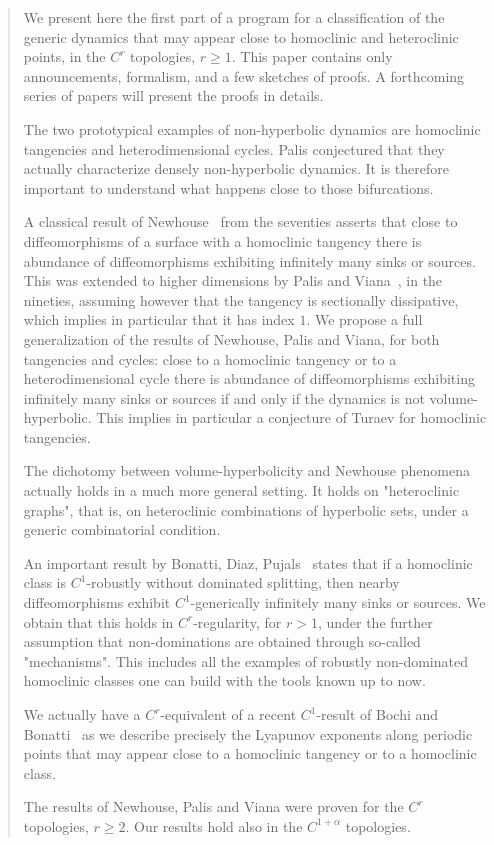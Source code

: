 \documentclass[11pt, a4paper]{amsart}
\theoremstyle{plain}
\theoremstyle{definition}
\theoremstyle{remark}
\numberwithin{equation}{section}         %
\begin{document}
\begin{abstract}
We present here the first part of a program for a classification of the generic dynamics that may appear close to homoclinic and heteroclinic points, in the $C^r$ topologies, $r\geq 1$. This paper contains only announcements, formalism, and a few sketches of proofs. A forthcoming series of papers will present the  proofs in details.


The two prototypical examples of non-hyperbolic dynamics are homoclinic tangencies and heterodimensional cycles. Palis conjectured that they actually characterize densely non-hyperbolic dynamics. It is therefore important to understand what happens close to those bifurcations. 

A classical result of Newhouse~\cite{N2} from the seventies asserts that close to diffeomorphisms of a surface with a homoclinic tangency there is abundance of diffeomorphisms exhibiting infinitely many sinks or sources. This was extended to higher dimensions by Palis and Viana~\cite{PV}, in the nineties, assuming however that the tangency is sectionally dissipative, which implies in particular that it has index $1$. 
We propose a full generalization of the results of Newhouse, Palis and Viana, for both tangencies and cycles: close to a homoclinic tangency or to a heterodimensional cycle there is abundance of diffeomorphisms exhibiting infinitely many sinks or sources if and only if the dynamics is not volume-hyperbolic. This implies in particular a conjecture of Turaev for homoclinic tangencies. 

The dichotomy between volume-hyperbolicity and Newhouse phenomena actually holds in a much more general setting. It holds on "heteroclinic graphs", that is, on heteroclinic combinations of hyperbolic sets, under a generic combinatorial condition. 

An important result by Bonatti, Diaz, Pujals~\cite{BDP} states that if a homoclinic class is $C^1$-robustly without dominated splitting, then  nearby diffeomorphisms exhibit $C^1$-generically infinitely many sinks or sources. 
We obtain that this holds in $C^r$-regularity, for $r>1$, under the further assumption that non-dominations are obtained through so-called "mechanisms". This includes all the examples of robustly non-dominated homoclinic classes one can build with the tools known up to now.

We actually have a $C^r$-equivalent of a recent $C^1$-result of Bochi and Bonatti~\cite{BB} as we describe precisely the Lyapunov exponents along periodic points that may appear close to a homoclinic tangency or to a homoclinic class. 

The results of Newhouse, Palis and Viana were proven for the $C^r$ topologies, $r\geq 2$. Our results hold also in the $C^{1+\alpha}$ topologies. 



\end{abstract}
\end{document}
